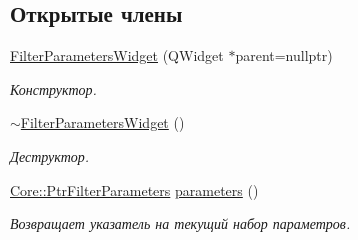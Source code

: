 \subsection*{Открытые члены}
\begin{DoxyCompactItemize}
\item 
\hyperlink{class_filter_parameters_widget_ade6b317bb498ff3785cbf380ada8b214}{Filter\+Parameters\+Widget} (Q\+Widget $\ast$parent=nullptr)\hypertarget{class_filter_parameters_widget_ade6b317bb498ff3785cbf380ada8b214}{}\label{class_filter_parameters_widget_ade6b317bb498ff3785cbf380ada8b214}

\begin{DoxyCompactList}\small\item\em Конструктор. \end{DoxyCompactList}\item 
\hyperlink{class_filter_parameters_widget_ab3394a4f66caf8faa7886b55bba647e1}{$\sim$\+Filter\+Parameters\+Widget} ()\hypertarget{class_filter_parameters_widget_ab3394a4f66caf8faa7886b55bba647e1}{}\label{class_filter_parameters_widget_ab3394a4f66caf8faa7886b55bba647e1}

\begin{DoxyCompactList}\small\item\em Деструктор. \end{DoxyCompactList}\item 
\hyperlink{namespace_core_a4811af8148ba137d644b9a61a042cf03}{Core\+::\+Ptr\+Filter\+Parameters} \hyperlink{class_filter_parameters_widget_a39ed363f640272273b3e4eb82bc75a21}{parameters} ()\hypertarget{class_filter_parameters_widget_a39ed363f640272273b3e4eb82bc75a21}{}\label{class_filter_parameters_widget_a39ed363f640272273b3e4eb82bc75a21}

\begin{DoxyCompactList}\small\item\em Возвращает указатель на текущий набор параметров. \end{DoxyCompactList}\end{DoxyCompactItemize}

